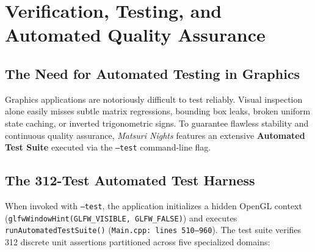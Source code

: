 \chapter{Verification, Testing, and Automated Quality Assurance}
\label{chap:testing}

\section{The Need for Automated Testing in Graphics}
Graphics applications are notoriously difficult to test reliably. Visual inspection alone easily misses subtle matrix regressions, bounding box leaks, broken uniform state caching, or inverted trigonometric signs. To guarantee flawless stability and continuous quality assurance, \textit{Matsuri Nights} features an extensive \textbf{Automated Test Suite} executed via the \texttt{--test} command-line flag.

\section{The 312-Test Automated Test Harness}
When invoked with \texttt{--test}, the application initializes a hidden OpenGL context (\texttt{glfwWindowHint(GLFW\_VISIBLE, GLFW\_FALSE)}) and executes \texttt{runAutomatedTestSuite()} (\texttt{Main.cpp: lines 510--960}). The test suite verifies 312 discrete unit assertions partitioned across five specialized domains:

